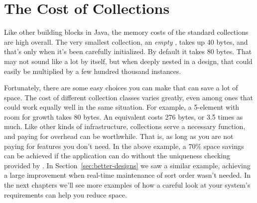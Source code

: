 
\section{The Cost of Collections}
\label{sec:designing-with-collections}

Like other building blocks in Java, the memory costs
of the standard collections are high overall. 
The very smallest collection, an \emph{empty}
, takes up 40 bytes, and that's only when it's been carefully
initialized. By default it takes 80 bytes. That may not sound like a lot by
itself, but when deeply nested in a design, that could easily be multiplied
by a few hundred thousand instances.  







Fortunately, there are some easy choices you can make that
can save a lot of space. The cost of different
collection classes varies greatly, even among ones that could work equally well
in the same situation. For example, a 5-element  with room for growth takes 80 bytes. An equivalent  costs 276 bytes,
or 3.5 times as much. Like other kinds of infrastructure, collections serve a
necessary function, and paying for overhead can be worthwhile. That is, as long as you are not
paying for features you don't need. In the above example, a
70\% space savings can be achieved if the application can do without the
uniqueness checking provided by .  In
Section~\ref{sec:better-designs} we saw a similar example, achieving a large
improvement when real-time
maintenance of sort order wasn't needed. In the next chapters we'll see more
examples of how a careful look at your system's
requirements can help you reduce space.

